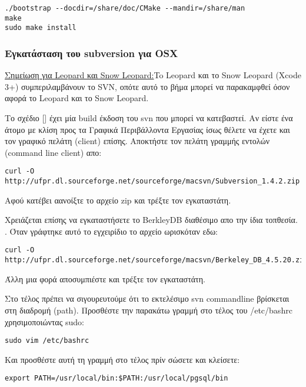 \begin{verbatim}
./bootstrap --docdir=/share/doc/CMake --mandir=/share/man
make
sudo make install
\end{verbatim}

\hypertarget{toc22}{}
\subsubsection{Εγκατάσταση του subversion για OSX}
\underline{Σημείωση για Leopard και Snow Leopard:}To Leopard και το Snow Leopard 
(Xcode 3+) συμπεριλαμβάνουν το SVN, οπότε αυτό το βήμα μπορεί να παρακαμφθεί όσον αφορά το Leopard και το Snow Leopard.

Το σχέδιο [] έχει μία build έκδοση του svn που μπορεί να κατεβαστεί. Αν είστε ένα άτομο με κλίση προς τα Γραφικά Περιβάλλοντα Εργασίας ίσως θέλετε να έχετε και τον γραφικό πελάτη (client) επίσης. Αποκτήστε τον πελάτη γραμμής εντολών (command line client) απο:

\begin{verbatim}
curl -O http://ufpr.dl.sourceforge.net/sourceforge/macsvn/Subversion_1.4.2.zip 
\end{verbatim}

Αφού κατέβει αανοίξτε το αρχείο zip και τρέξτε τον εγκαταστάτη.

Χρειάζεται επίσης να εγκαταστήσετε το BerkleyDB διαθέσιμο απο την ίδια τοπθεσία.
. Όταν γράφτηκε αυτό το εγχειρίδιο το αρχείο ωρισκόταν εδω:

\begin{verbatim}
curl -O http://ufpr.dl.sourceforge.net/sourceforge/macsvn/Berkeley_DB_4.5.20.zip 
\end{verbatim}

Άλλη μια φορά αποσυμπιέστε και τρέξτε τον εγκαταστάτη.

Στο τέλος πρέπει να σιγουρευτούμε ότι το εκτελέσιμο svn commandline βρίσκεται στη διαδρομή (path).
Προσθέστε την παρακάτω γραμμή στο τέλος του /etc/bashrc χρησιμοποιώντας sudo:

\begin{verbatim}
sudo vim /etc/bashrc 
\end{verbatim}

Και προσθέστε αυτή τη γραμμή στο τέλος πρίν σώσετε και κλείσετε:

\begin{verbatim}
export PATH=/usr/local/bin:$PATH:/usr/local/pgsql/bin 
\end{verbatim}

